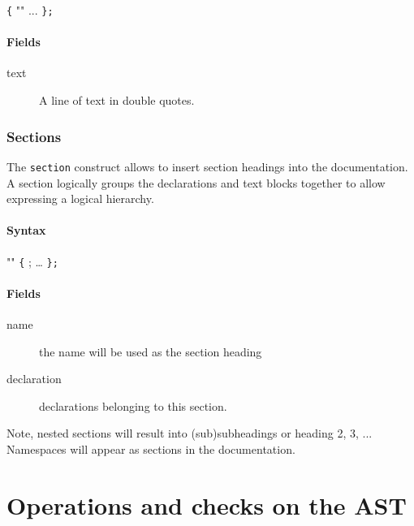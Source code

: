 \documentclass[a4paper,11pt,twoside]{report}
\begin{document}
{{\begin{syntax}
 \verb+{+
    ""
    ...
\verb+};+
\end{syntax}

\subsubsection{Fields}

\begin{description}
    \item[text] A line of text in double quotes.
\end{description}

\subsection{Sections}
\label{sec:doc:section}
The \texttt{section} construct allows to insert section headings into the 
documentation. A section logically groups the declarations and text blocks 
together to allow expressing a logical hierarchy. 

\subsubsection{Syntax}

\begin{syntax}
 ""  \verb+{+
    ;
    \ldots
\verb+};+
\end{syntax}

\subsubsection{Fields}

\begin{description}
    \item[name] the name will be used as the section heading
    \item[declaration] declarations belonging to this section. 
\end{description}

Note, nested sections will result into (sub)subheadings or heading 2, 3, ...
Namespaces will appear as sections in the documentation.


\chapter{Operations and checks on the AST}
\label{chap:astops}

}}
\end{document}
